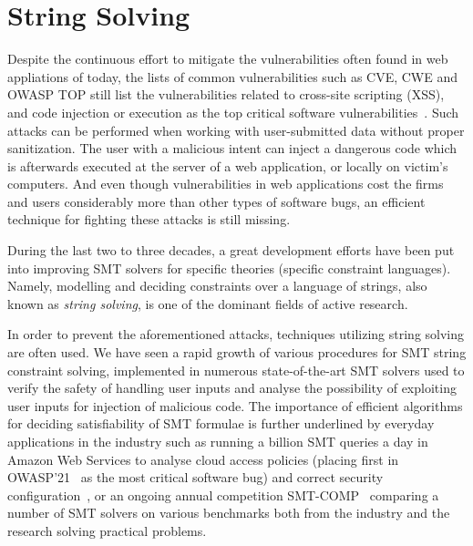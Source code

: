 \chapter{String Solving}
\label{chap:string_solving}

Despite the continuous effort to mitigate the vulnerabilities often found in web appliations of today, the lists of common vulnerabilities such as CVE, CWE and OWASP TOP still list the vulnerabilities related to cross-site scripting (XSS), and code injection or execution as the top critical software vulnerabilities~\cite{OWASP13,OWASP17,OWASP21,cwe-top-25-2022, cwe-top-25-2023}.
Such attacks can be performed when working with user-submitted data without proper sanitization.
The user with a malicious intent can inject a dangerous code which is afterwards executed at the server of a web application, or locally on victim's computers.
And even though vulnerabilities in web applications cost the firms and users considerably more than other types of software bugs, an efficient technique for fighting these attacks is still missing.

During the last two to three decades, a great development efforts have been put into improving SMT solvers for specific theories (specific constraint languages).
Namely, modelling and deciding constraints over a language of strings, also known as \emph{string solving}, is one of the dominant fields of active research.

In order to prevent the aforementioned attacks, techniques utilizing string solving are often used.
We have seen a rapid growth of various procedures for SMT string constraint solving, implemented in numerous state-of-the-art SMT solvers used to verify the safety of handling user inputs and analyse the possibility of exploiting user inputs for injection of malicious code.
The importance of efficient algorithms for deciding satisfiability of SMT formulae is further underlined by everyday applications in the industry such as running a billion SMT queries a day in Amazon Web Services to analyse cloud access policies (placing first in OWASP'21~\cite{OWASP21} as the most critical software bug) and correct security configuration~\cite{Rungta2022}, or an ongoing annual competition SMT-COMP~\cite{smt_comp} comparing a number of SMT solvers on various benchmarks both from the industry and the research solving practical problems.

